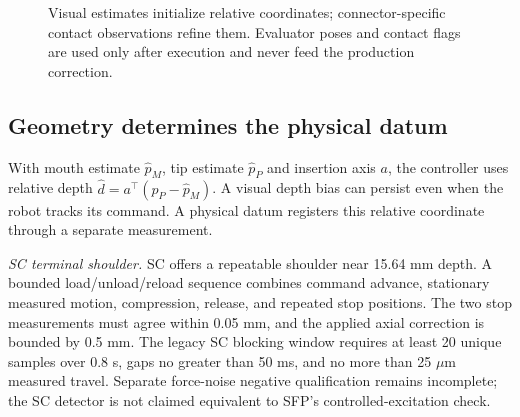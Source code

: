 \documentclass[letterpaper,10pt,conference]{ieeeconf}
\begin{document}
\begin{figure}[t]
\centering
{}
\caption{Visual estimates initialize relative coordinates; connector-specific
contact observations refine them. Evaluator poses and contact flags are used
only after execution and never feed the production correction.}
\label{fig:pipeline}
\end{figure}

\subsection{Geometry determines the physical datum}
With mouth estimate $\widehat p_M$, tip estimate $\widehat p_P$ and insertion
axis $a$, the controller uses relative depth
$\widehat d=a^\top(\widehat p_P-\widehat p_M)$. A visual depth bias can
persist even when the robot tracks its command. A physical datum registers
this relative coordinate through a separate measurement.

\textit{SC terminal shoulder.} SC offers a repeatable shoulder near 15.64 mm
depth. A bounded load/unload/reload sequence combines command advance,
stationary measured motion, compression, release, and repeated stop positions.
The two stop measurements must agree within 0.05 mm, and the applied axial
correction is bounded by 0.5 mm. The legacy SC blocking window requires at
least 20 unique samples over 0.8 s, gaps no greater than 50 ms, and no more
than 25 $\mu$m measured travel. Separate force-noise negative qualification
remains incomplete; the SC detector is not claimed equivalent to SFP's
controlled-excitation check.
\end{document}
